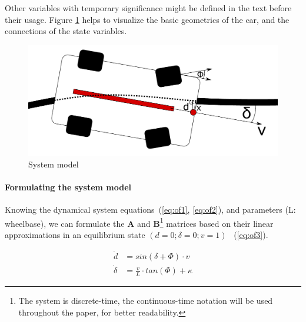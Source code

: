 Other variables with temporary significance might be defined in the text before their usage. Figure \ref{fig:cartop} helps to visualize the basic geometrics of the car, and the connections of the state variables.

\begin{figure}[!ht]
    \centering
    \includegraphics[width=0.7\linewidth]{img/cartop}
    \caption{System model}
    \label{fig:cartop}
\end{figure}

\paragraph{Formulating the system model}

Knowing the dynamical system equations~(\ref{eq:of1}, \ref{eq:of2}), and parameters (L: wheelbase), we can formulate the \textbf{A} and \textbf{B}\footnote{The system is discrete-time, the continuous-time notation will be used throughout the paper, for better readability.} matrices based on their linear approximations in an equilibrium state $(d = 0; \delta = 0; v = 1)$ ~(\ref{eq:of3}).

\begin{align} 
    \dot{d} &= sin(\delta + \Phi) \cdot v  \label{eq:of1} \\ 
    \dot{\delta} &= \frac{v}{L} \cdot tan(\Phi) + \kappa \label{eq:of2}
\end{align}

